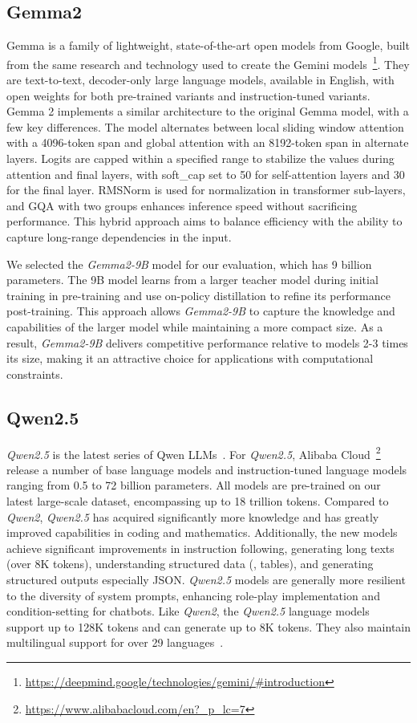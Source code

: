 \subsection{Gemma2}\label{subsec:empirical-evaluation:candidate-models:gemma2}
Gemma is a family of lightweight, state-of-the-art open models from Google, built from the same research and technology used to create the Gemini models~\footnote{\url{https://deepmind.google/technologies/gemini/#introduction}}.
They are text-to-text, decoder-only large language models, available in English, with open weights for both pre-trained variants and instruction-tuned variants.
Gemma 2 implements a similar architecture to the original Gemma model, with a few key differences.
The model alternates between local sliding window attention with a 4096-token span and global attention with an 8192-token span in alternate layers.
Logits are capped within a specified range to stabilize the values during attention and final layers, with soft\_cap set to 50 for self-attention layers and 30 for the final layer.
RMSNorm is used for normalization in transformer sub-layers, and \ac{GQA} with two groups enhances inference speed without sacrificing performance.
This hybrid approach aims to balance efficiency with the ability to capture long-range dependencies in the input.

We selected the \textit{Gemma2-9B} model for our evaluation, which has 9 billion parameters.
The 9B model learns from a larger teacher model during initial training in pre-training and use on-policy distillation to refine its performance post-training.
This approach allows \textit{Gemma2-9B} to capture the knowledge and capabilities of the larger model while maintaining a more compact size.
As a result, \textit{Gemma2-9B} delivers competitive performance relative to models 2-3 times its size, making it an attractive choice for applications with computational constraints.

\subsection{Qwen2.5}\label{subsec:empirical-evaluation:candidate-models:qwen2.5}
\textit{Qwen2.5} is the latest series of Qwen LLMs~\cite{qwen2}.
For \textit{Qwen2.5}, Alibaba Cloud~\footnote{\url{https://www.alibabacloud.com/en?_p_lc=7}} release a number of base language models and instruction-tuned language models ranging from 0.5 to 72 billion parameters.
All models are pre-trained on our latest large-scale dataset, encompassing up to 18 trillion tokens.
Compared to \textit{Qwen2}, \textit{Qwen2.5} has acquired significantly more knowledge and has greatly improved capabilities in coding and mathematics.
Additionally, the new models achieve significant improvements in instruction following, generating long texts (over 8K tokens), understanding structured data (\eg, tables), and generating structured outputs especially JSON.
\textit{Qwen2.5} models are generally more resilient to the diversity of system prompts, enhancing role-play implementation and condition-setting for chatbots.
Like \textit{Qwen2}, the \textit{Qwen2.5} language models support up to 128K tokens and can generate up to 8K tokens.
They also maintain multilingual support for over 29 languages~\cite{qwen2.5}.

